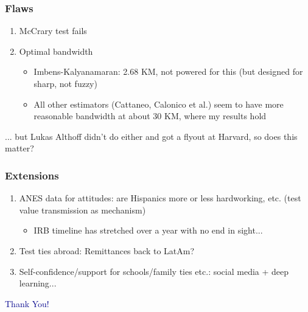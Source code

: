\documentclass{beamer}
\begin{document}
\begin{frame}
\frametitle{Flaws}
\begin{enumerate}
\item McCrary test fails

\item Optimal bandwidth 
\begin{itemize}
\item Imbens-Kalyanamaran: 2.68 KM, not powered for this (but designed for sharp, not fuzzy)
\item All other estimators (Cattaneo, Calonico et al.) seem to have more reasonable bandwidth at about 30 KM, where my results hold
\end{itemize}

\end{enumerate}

... but Lukas Althoff didn't do either and got a flyout at Harvard, so does this matter?
\end{frame}

\begin{frame}
\frametitle{Extensions}
\begin{enumerate}
\item ANES data for attitudes: are Hispanics more or less hardworking, etc. (test value transmission as mechanism)
\begin{itemize}
\item IRB timeline has stretched over a year with no end in sight...
\end{itemize}

\item Test ties abroad: Remittances back to LatAm?
\item Self-confidence/support for schools/family ties etc.: social media + deep learning...

\end{enumerate}

\end{frame}

		
\begin{frame}
\Large \centering \textcolor{darkblue}{Thank You!}
\end{frame}




\end{document}
